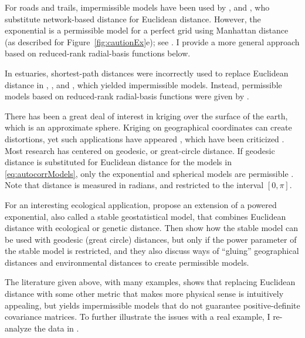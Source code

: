 \documentclass[11pt, titlepage]{article}\usepackage[]{graphicx}\usepackage[]{color}
\begin{document}
\begin{spacing}{1.9}
\begin{flushleft}
For roads and trails, impermissible models have been used by \citet{Shio:Shio:stre:2011}, \citet{Selb:Kock:spat:2013} and \citet{Ladl:Avga:Whea:Boyc:pred:2016}, who substitute network-based distance for Euclidean distance.  However, the exponential is a permissible model for a perfect grid using Manhattan distance (as described for Figure~\ref{fig:cautionEx}e); see \citet{Curr:NonE:2006}. I provide a more general approach based on reduced-rank radial-basis functions below. 

In estuaries, shortest-path distances were incorrectly used to replace Euclidean distance in \citet{Litt:Edwa:Port:krig:1997}, \citet{Rath:spat:1998}, and \citet{Jens:Chri:Mill:land:2006}, which yielded impermissible models.  Instead, permissible models based on reduced-rank radial-basis functions were given by \citet{Wang:Rana:low:2007}.

There has been a great deal of interest in kriging over the surface of the earth, which is an approximate sphere.  Kriging on geographical coordinates can create distortions, yet such applications have appeared \citep{Ecke:Gelf:baye:1997,Kalu:Vega:Card:Shel:anal:1998}, which have been criticized \citep{Bane:geod:2005}. Most research has centered on geodesic, or great-circle distance. If geodesic distance is substituted for Euclidean distance for the models in \ref{eq:autocorrModels}, only the exponential and spherical models are permissible \citep{Gnei:stri:2013}.  Note that distance is measured in radians, and restricted to the interval $[0,\pi]$.

For an interesting ecological application, \citet{Brad:Ralp:Coop:dise:2013} propose an extension of a powered exponential, also called a stable geostatistical model, that combines Euclidean distance with ecological or genetic distance. Then \citet{Guil:Schi:Porc:Bevi:vali:2014} show how the stable model can be used with geodesic (great circle) distances, but only if the power parameter of the stable model is restricted, and they also discuss ways of ``gluing'' geographical distances and environmental distances to create permissible models.

The literature given above, with many examples, shows that replacing Euclidean distance with some other metric that makes more physical sense is intuitively appealing, but yields impermissible models that do not guarantee positive-definite covariance matrices. To further illustrate the issues with a real example, I re-analyze the data in \citet{Ladl:Avga:Whea:Boyc:pred:2016}. 


\end{flushleft}
\end{spacing}
\end{document}
